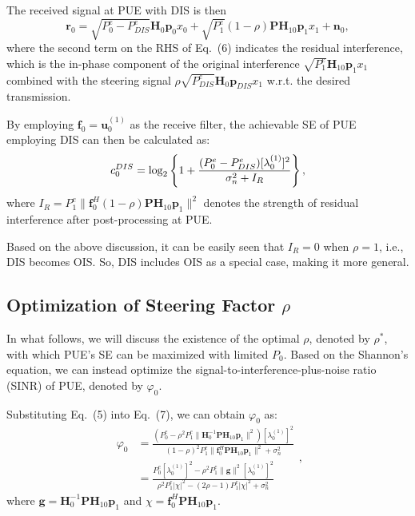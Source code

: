 \documentclass[10pt, conference, letterpaper]{IEEEtran}
\begin{document}
The received signal at PUE with DIS is then
\begin{equation}
\mathbf{r}_{0}=\sqrt{P^{e}_{0}-P^{e}_{DIS}}\mathbf{H}_{0}\mathbf{p}_{0}{x}_{0}
+\sqrt{P^{e}_{1}}(1-\rho)\mathbf{P}\mathbf{H}_{10}\mathbf{p}_{1}x_{1}+\mathbf{n}_{0},
\end{equation}
where the second term on the RHS of Eq.~(6) indicates the residual interference,
which is the in-phase component of the original interference
$\sqrt{P^{e}_{1}}\mathbf{H}_{10}\mathbf{p}_{1}x_{1}$ combined with the steering signal
$\rho\sqrt{P^{e}_{DIS}}\mathbf{H}_{0}\mathbf{p}_{DIS}x_{1}$
w.r.t. the desired transmission.

By employing $\mathbf{f}_{0}=\mathbf{u}^{(1)}_{0}$ as the receive filter,
the achievable SE of PUE employing DIS can then be calculated as:
\begin{equation}
\vspace*{-0.05in}
c^{DIS}_{0}=\log_{2}\left\{
1+\frac{(P^{e}_{0}-P^{e}_{DIS})[\lambda^{(1)}_{0}]^{2}}
{\sigma^{2}_{n}+I_{R}}
\right\},
\end{equation}
where $I_{R}=P^{e}_{1}\|\mathbf{f}^{H}_{0}(1-\rho)\mathbf{P}\mathbf{H}_{10}\mathbf{p}_{1}\|^2$
denotes the strength of residual interference after post-processing at PUE.

Based on the above discussion, it can be easily seen that $I_{R}=0$ when $\rho=1$,
i.e., DIS becomes OIS. So, DIS includes OIS as a special case, making it more general.

\subsection{Optimization of Steering Factor $\rho$}

In what follows, we will discuss the existence of the optimal $\rho$,
denoted by $\rho^{*}$, with which PUE's SE can be maximized with limited $P_{0}$.
Based on the Shannon's equation, we can instead optimize the signal-to-interference-plus-noise
ratio (SINR) of PUE, denoted by $\varphi_{0}$.

Substituting Eq.~(5) into Eq.~(7), we can obtain $\varphi_{0}$ as:
\begin{equation}
\begin{aligned}
\varphi_{0}&=\frac{\left(P^{e}_{0}-\rho^2P^{e}_{1}\|\mathbf{H}^{-1}_{0}\mathbf{P}\mathbf{H}_{10}
\mathbf{p}_{1}\|^2\right)[\lambda^{(1)}_{0}]^2}
{(1-\rho)^2P^{e}_{1}\|\mathbf{f}^{H}_{0}\mathbf{P}\mathbf{H}_{10}\mathbf{p}_{1}\|^2+\sigma^2_{n}}\\
&=\frac{P^{e}_{0}[\lambda^{(1)}_{0}]^2-\rho^2P^{e}_{1}\|\mathbf{g}\|^2[\lambda^{(1)}_{0}]^2}{\rho^2P^{e}_{1}
|\chi|^2-(2\rho-1)P^{e}_{1}|\chi|^2+\sigma^2_{n}}
\end{aligned},
\end{equation}
where $\mathbf{g}=\mathbf{H}^{-1}_{0}\mathbf{P}\mathbf{H}_{10}\mathbf{p}_{1}$ and
$\chi=\mathbf{f}^{H}_{0}\mathbf{P}\mathbf{H}_{10}\mathbf{p}_{1}$.
\end{document}
